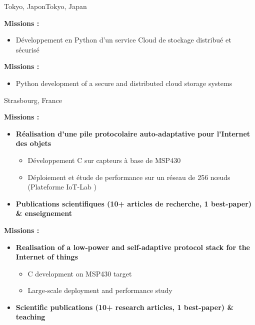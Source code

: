 {}{}{\ifnativelang Tokyo, Japon\else Tokyo, Japan\fi}{
\ifnativelang
	\textcolor{color1}{\textbf{Missions :}}
	\begin{itemize}[leftmargin=\ListItemsMargins]
		\item D\'eveloppement en Python d'un service Cloud de stockage distribu\'e et s\'ecuris\'e
	\end{itemize}
\else
	\textcolor{color1}{\textbf{Missions :}}
	\begin{itemize}[leftmargin=\ListItemsMargins]
		\item Python development of a secure and distributed cloud storage systems
	\end{itemize}
\fi
}

\vspace{\ItemsMaxSpacing}

{}{}{Strasbourg, France}{
\ifnativelang
	\textcolor{color1}{\textbf{Missions :}}
	\begin{itemize}[leftmargin=\ListItemsMargins]
		\item \textbf{R\'ealisation d'une pile protocolaire auto-adaptative pour l'Internet des objets}
		\begin{itemize}
			\item D\'eveloppement C sur capteurs \`a base de MSP430
			\item D\'eploiement et étude de performance sur un r\'eseau de 256 n\oe uds (Plateforme IoT-Lab \textcolor{color1}{\href{https://www.iot-lab.info/}{\ExternalLink}})
		\end{itemize}
		\ifaddmngt
		\item \textbf{Publications scientifiques (10+ articles de recherche, 1 best-paper) \& enseignement}
		\fi
	\end{itemize}
\else
	\textcolor{color1}{\textbf{Missions :}}
	\begin{itemize}[leftmargin=\ListItemsMargins]
		\item \textbf{Realisation of a low-power and self-adaptive protocol stack for the Internet of things}
		\begin{itemize}
			\item C development on MSP430 target
			\item Large-scale deployment and performance study
		\end{itemize}
		\item \textbf{Scientific publications (10+ research articles, 1 best-paper) \& teaching}
	\end{itemize}
\fi
}


